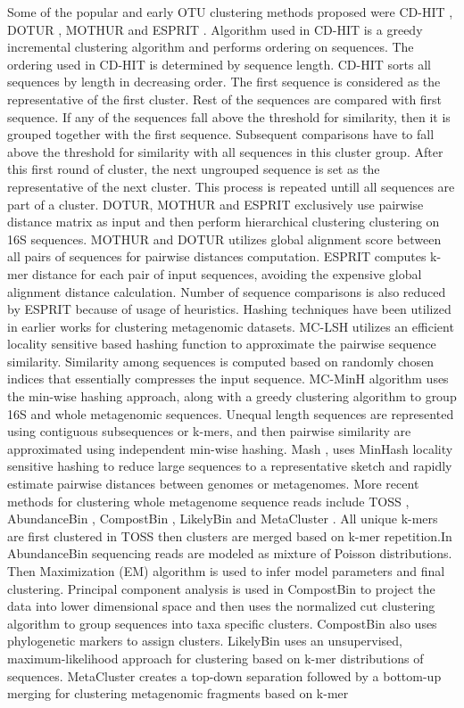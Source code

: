 \documentclass[10pt, conference, compsocconf]{IEEEtran}
\begin{document}
Some of the popular and early OTU clustering methods proposed were CD-HIT \cite{MARCDhit}, DOTUR \cite{MARDOTUR}, MOTHUR \cite{MARMothur} and ESPRIT \cite{MAREspirit}. Algorithm used in CD-HIT is a greedy incremental clustering algorithm and performs ordering on sequences. The ordering used in CD-HIT is determined by sequence length. CD-HIT sorts all sequences by length in decreasing order. The first sequence is considered as the representative of the first cluster. Rest of the sequences are compared with first sequence. If any of the sequences fall above the threshold for similarity, then it is grouped together with the first sequence. Subsequent comparisons have to fall above the threshold for similarity with all sequences in this cluster group. After this first round of cluster, the next ungrouped sequence is set as the representative of the next cluster. This process is repeated untill all sequences are part of a cluster. DOTUR, MOTHUR and ESPRIT exclusively use pairwise distance matrix as input and then perform hierarchical clustering clustering on 16S sequences. MOTHUR and DOTUR utilizes global alignment score between all pairs of sequences for pairwise distances computation. ESPRIT computes k-mer distance for each pair of input sequences, avoiding the expensive global alignment distance calculation. Number of sequence comparisons is also reduced by ESPRIT because of usage of heuristics. Hashing techniques have been utilized in earlier works for clustering metagenomic datasets. MC-LSH \cite{MARMetaLSH} utilizes an efficient locality sensitive based hashing function to approximate the pairwise sequence similarity. Similarity among sequences is computed based on randomly chosen indices that essentially compresses the input sequence. MC-MinH \cite{MARMcMinH} algorithm uses the min-wise \cite{MARMinWise} hashing approach, along with a greedy clustering algorithm to group 16S and whole metagenomic sequences. Unequal length sequences are represented using contiguous subsequences or k-mers, and then pairwise similarity are approximated using independent min-wise hashing. Mash \cite{MAROtherMinH}, uses MinHash locality sensitive hashing to reduce large sequences to a representative sketch and rapidly estimate pairwise distances between genomes or metagenomes. More recent methods for clustering whole metagenome sequence reads include TOSS \cite{MARToss}, AbundanceBin \cite{MARAbundant}, CompostBin \cite{MARCompost}, LikelyBin \cite{MARLikelyBin} and MetaCluster \cite{MARMetaCluster}. All unique k-mers are first clustered in TOSS then clusters are merged based on k-mer repetition.In AbundanceBin sequencing reads are modeled as mixture of Poisson distributions. Then Maximization (EM) algorithm is used to infer model parameters and final clustering. Principal component analysis is used in CompostBin to project the data into lower dimensional space and then uses the normalized cut clustering \cite{MARNormalizedCut} algorithm to group sequences into taxa specific clusters. CompostBin also uses phylogenetic markers to assign clusters. LikelyBin uses an unsupervised, maximum-likelihood approach for clustering based on k-mer distributions of sequences. MetaCluster creates a top-down separation followed by a bottom-up merging for clustering metagenomic fragments based on k-mer 
\end{document}

